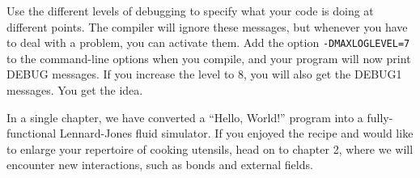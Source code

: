 Use the different levels of debugging to specify what your code is doing at 
different points. The compiler will ignore these messages, but whenever you have 
to deal with a problem, you can activate them. Add the option 
\texttt{-DMAXLOGLEVEL=7} to the command-line options when you compile, and your 
program will now print DEBUG messages. If you increase the level to 8, you will 
also get the DEBUG1 messages. You get the idea.

In a single chapter, we have converted a ``Hello, World!'' program into a 
fully-functional Lennard-Jones fluid simulator. If you enjoyed the recipe and
would like to enlarge your repertoire of cooking utensils, head on to chapter 2,
where we will encounter new interactions, such as bonds and external fields.

